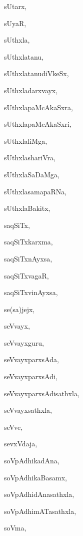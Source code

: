 \begin{multicols}{2}
{sUtarx}, \pageref{sUtarx}

{sUyaR}, \pageref{sUyaR}

{sUthxla}, \pageref{sUthxla}

{sUthxlatanu}, \pageref{sUthxlatanu}

{sUthxlatanudiVkeSx}, \pageref{sUthxlatanudiVkeSx}

{sUthxladarxvayx}, \pageref{sUthxladarxvayx}

{sUthxlapaMcAkaSxra}, \pageref{sUthxlapaMcAkaSxra}

{sUthxlapaMcAkaSxri}, \pageref{sUthxlapaMcAkaSxri}

{sUthxlaliMga}, \pageref{sUthxlaliMga}

{sUthxlashariVra}, \pageref{sUthxlashariVra}

{sUthxlaSaDaMga}, \pageref{sUthxlaSaDaMga}

{sUthxlasamapaRNa}, \pageref{sUthxlasamapaRNa}

{sUthxlaBakitx}, \pageref{sUthxlaBakitx}

{saqSiTx}, \pageref{saqSiTx}

{saqSiTxkarxma}, \pageref{saqSiTxkarxma}

{saqSiTxnAyxsa}, \pageref{saqSiTxnAyxsa}

{saqSiTxvagaR}, \pageref{saqSiTxvagaR}

{saqSiTxvinAyxsa}, \pageref{saqSiTxvinAyxsa}

{se(sa)jejx}, \pageref{sesajejx}

{seVvayx}, \pageref{seVvayx}

{seVvayxguru}, \pageref{seVvayxguru}

{seVvayxparxsAda}, \pageref{seVvayxparxsAda}

{seVvayxparxsAdi}, \pageref{seVvayxparxsAdi}

{seVvayxparxsAdisathxla}, \pageref{seVvayxparxsAdisathxla}

{seVvayxsathxla}, \pageref{seVvayxsathxla}

{seVve}, \pageref{seVve}

{sevxVdaja}, \pageref{sevxVdaja}

{soVpAdhikadAna}, \pageref{soVpAdhikadAna}

{soVpAdhikaBasamx}, \pageref{soVpAdhikaBasamx}

{soVpAdhidAnasathxla}, \pageref{soVpAdhidAnasathxla}

{soVpAdhimATasathxla}, \pageref{soVpAdhimATasathxla}

{soVma}, \pageref{soVma}


\end{multicols}

